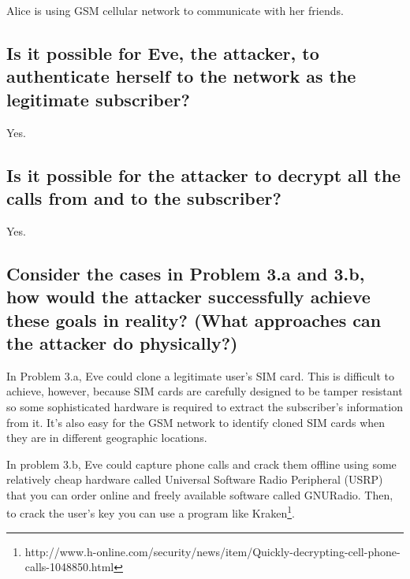 \documentclass[a4paper]{report}
\begin{document}
Alice is using GSM cellular network to communicate with her friends.

\subsection{Is it possible for Eve, the attacker, to authenticate herself to the network as the
      legitimate subscriber?}

Yes.

\subsection{Is it possible for the attacker to decrypt all the calls from and to the subscriber?}

Yes.

\subsection{Consider the cases in Problem 3.a and 3.b, how would the attacker successfully
      achieve these goals in \textbf{reality}? (What approaches can the attacker do physically?)}

In Problem 3.a, Eve could clone a legitimate user's SIM card. This is difficult to achieve, however,
because SIM cards are carefully designed to be tamper resistant so some sophisticated hardware is
required to extract the subscriber's information from it. It's also easy for the GSM network to identify
cloned SIM cards when they are in different geographic locations.

In problem 3.b, Eve could capture phone calls and crack them offline using some relatively cheap hardware
called Universal Software Radio Peripheral (USRP) that you can order online and freely available software
called GNURadio. Then, to crack the user's key you can use a program like
Kraken\footnote{http://www.h-online.com/security/news/item/Quickly-decrypting-cell-phone-calls-1048850.html}.
\end{document}
